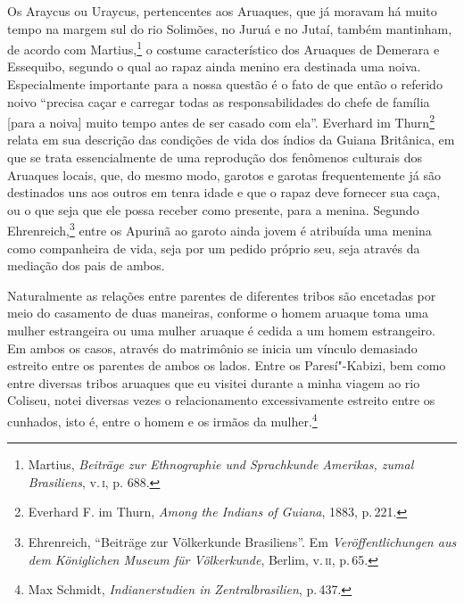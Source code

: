 Os Araycus ou Uraycus, pertencentes aos Aruaques, que já moravam há muito
tempo na margem sul do rio Solimões, no Juruá e no Jutaí, também
mantinham, de acordo com Martius,\footnote{Martius, \textit{Beiträge zur
  Ethnographie und Sprachkunde Amerikas, zumal Brasiliens}, v.\,\textsc{i}, p.
  688.} o costume característico dos Aruaques de Demerara e Essequibo,
segundo o qual ao rapaz ainda menino era destinada uma noiva.
Especialmente importante para a nossa questão é o fato de que então o
referido noivo ``precisa caçar e carregar todas as responsabilidades do
chefe de família {[}para a noiva{]} muito tempo antes de ser casado com
ela''. Everhard im Thurn\footnote{Everhard F. im Thurn, \textit{Among the
  Indians of Guiana}, 1883, p.\,221.} relata em sua descrição das
condições de vida dos índios da Guiana Britânica, em que se trata
essencialmente de uma reprodução dos fenômenos culturais dos Aruaques
locais, que, do mesmo modo, garotos e garotas frequentemente já são
destinados uns aos outros em tenra idade e que o rapaz deve fornecer sua
caça, ou o que seja que ele possa receber como presente, para a menina.
Segundo Ehrenreich,\footnote{Ehrenreich, ``Beiträge zur Völkerkunde
  Brasiliens''. Em \textit{Veröffentlichungen aus dem Königlichen Museum
  für Völkerkunde}, Berlim, v.\,\textsc{ii}, p.\,65.} entre os Apurinã ao garoto
ainda jovem é atribuída uma menina como companheira de vida, seja por um
pedido próprio seu, seja através da mediação dos pais de ambos.

Naturalmente as relações entre parentes de diferentes tribos são
encetadas por meio do casamento de duas maneiras, conforme o homem
aruaque toma uma mulher estrangeira ou uma mulher aruaque é cedida a um
homem estrangeiro. Em ambos os casos, através do matrimônio se inicia um
vínculo demasiado estreito entre os parentes de ambos os lados. Entre
os Paresí"-Kabizi, bem como entre diversas tribos aruaques que eu visitei
durante a minha viagem ao rio Coliseu, notei diversas vezes o
relacionamento excessivamente estreito entre os cunhados, isto é, entre
o homem e os irmãos da mulher.\footnote{Max Schmidt,
  \textit{Indianerstudien in Zentralbrasilien}, p.\,437.}

